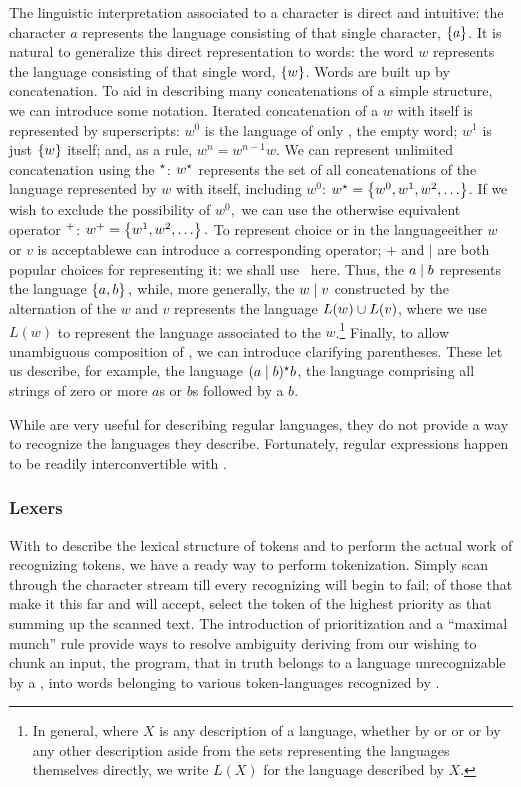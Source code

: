 The linguistic interpretation associated to a character is direct and intuitive: the character $a$ represents the language consisting of that single character, $\left\{ a \right\}$. It is natural to generalize this direct representation to words: the word $w$ represents the language consisting of that single word, $\left\{ w \right\}$. Words are built up by concatenation. To aid in describing many concatenations of a simple structure, we can introduce some notation. Iterated concatenation of a \regex $w$ with itself is represented by superscripts: $w^{0}$ is the language of only \emptyword, the empty word; $w^{1}$ is just $\left\{ w \right\}$ itself; and, as a rule, $w^{n} = w^{n-1}w$. We can represent unlimited concatenation using the  $^{\star}{}$: $w^{\star}{}$ represents the set of all concatenations of the language represented by $w$ with itself, including $w^{0}$: $w\kstar = \set{w^{0}, w^{1}, w^{2}, \dotsc}$. If we wish to exclude the possibility of $w^{0},$ we can use the otherwise equivalent  operator $^{+}{}$: $w\posclos = \set{w^{1}, w^{2}, \dotsc}.$ To represent choice or  in the language\empause either \regex $w$ or \regex $v$ is acceptable\empause we can introduce a corresponding operator; $+$ and $\vert$ are both popular choices for representing it: we shall use \alt\ here. Thus, the \regex $a \mid b$ represents the language $\left\{ a, b \right\},$ while, more generally, the \regex $w \mid v$ constructed by the alternation of the \regexes $w$ and $v$ represents the language $L(w) \cup L(v)$, where we use $L(w)$ to represent the language associated to the \regex $w$.\footnote{In general, where $X$ is any description of a language, whether by \TM or \FA or \regex or by any other description aside from the sets representing the languages themselves directly, we write $L(X)$ for the language described by $X$.} Finally, to allow unambiguous composition of \regexes, we can introduce clarifying parentheses. These let us describe, for example, the language $(a \mid b)^{\star}{} b$, the language comprising all strings of zero or more $a$s or $b$s followed by a $b$.

While \regexes are very useful for describing regular languages, they do not provide a way to recognize the languages they describe. Fortunately, regular expressions happen to be readily interconvertible with \FAs.

\subsubsection{Lexers}
With \regexes to describe the lexical structure of tokens and \FAs to perform the actual work of recognizing tokens, we have a ready way to perform tokenization. Simply scan through the character stream till every recognizing \FA will begin to fail; of those that make it this far and will accept, select the token of the highest priority as that summing up the scanned text. The introduction of prioritization and a ``maximal munch'' rule provide ways to resolve ambiguity deriving from our wishing to chunk an input, the program, that in truth belongs to a language unrecognizable by a \FA{}, into words belonging to various token-languages recognized by \FAs.

